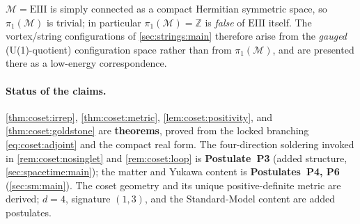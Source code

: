 \begin{remark}\label{rem:coset:topology}
$\mathcal M = \mathrm{EIII}$ is simply connected as a compact Hermitian
symmetric space, so $\pi_{1}(\mathcal M)$ is trivial; in particular
$\pi_{1}(\mathcal M)=\mathbb Z$ is \emph{false} of $\mathrm{EIII}$ itself. The
vortex/string configurations of \autoref{sec:strings:main} therefore arise from the
\emph{gauged} (U(1)-quotient) configuration space rather than from
$\pi_{1}(\mathcal M)$, and are presented there as a low-energy correspondence.
\end{remark}

\paragraph{Status of the claims.}
\autoref{thm:coset:irrep}, \autoref{thm:coset:metric},
\autoref{lem:coset:positivity}, and \autoref{thm:coset:goldstone} are
\textbf{theorems}, proved from the locked branching \eqref{eq:coset:adjoint} and
the compact real form. The four-direction soldering invoked in
\autoref{rem:coset:nosinglet} and \autoref{rem:coset:loop} is
\textbf{Postulate~P3} (added structure, \autoref{sec:spacetime:main}); the matter and
Yukawa content is \textbf{Postulates~P4, P6} (\autoref{sec:sm:main}). The coset geometry and its unique positive-definite
metric are derived; $d=4$, signature $(1,3)$, and the Standard-Model
content are added postulates.
